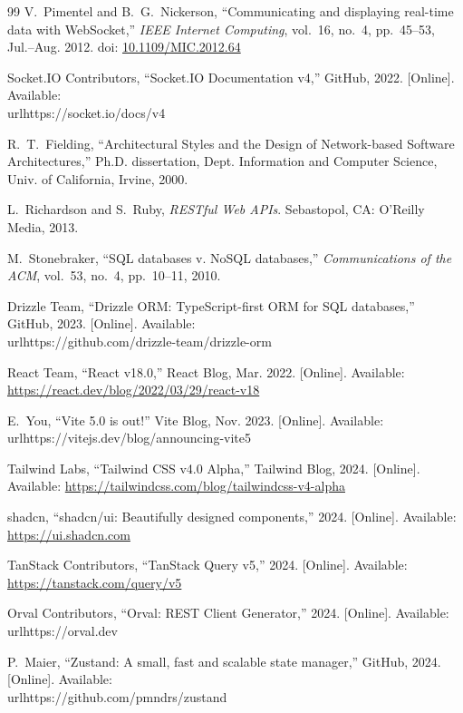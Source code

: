 \documentclass[12pt,a4paper]{article}
\begin{document}
\begin{thebibliography}{99}
V.~Pimentel and B.~G.~Nickerson,
``Communicating and displaying real-time data with WebSocket,''
\textit{IEEE Internet Computing}, vol.~16, no.~4,
pp.~45--53, Jul.--Aug. 2012.
doi: \href{https://doi.org/10.1109/MIC.2012.64}{10.1109/MIC.2012.64}

Socket.IO Contributors, ``Socket.IO Documentation v4,''
GitHub, 2022.
[Online]. Available: \\url{https://socket.io/docs/v4}

R.~T.~Fielding,
``Architectural Styles and the Design of Network-based
Software Architectures,''
Ph.D. dissertation, Dept. Information and Computer Science,
Univ. of California, Irvine, 2000.

L.~Richardson and S.~Ruby,
\textit{RESTful Web APIs}.
Sebastopol, CA: O'Reilly Media, 2013.

M.~Stonebraker, ``SQL databases v. NoSQL databases,''
\textit{Communications of the ACM},
vol.~53, no.~4, pp.~10--11, 2010.

Drizzle Team, ``Drizzle ORM: TypeScript-first ORM for SQL databases,''
GitHub, 2023.
[Online]. Available: \\url{https://github.com/drizzle-team/drizzle-orm}

React Team, ``React v18.0,'' React Blog, Mar. 2022.
[Online]. Available: \url{https://react.dev/blog/2022/03/29/react-v18}

E.~You, ``Vite 5.0 is out!'' Vite Blog, Nov. 2023.
[Online]. Available: \\url{https://vitejs.dev/blog/announcing-vite5}

Tailwind Labs, ``Tailwind CSS v4.0 Alpha,'' Tailwind Blog, 2024.
[Online]. Available: \url{https://tailwindcss.com/blog/tailwindcss-v4-alpha}

shadcn, ``shadcn/ui: Beautifully designed components,'' 2024.
[Online]. Available: \url{https://ui.shadcn.com}

TanStack Contributors, ``TanStack Query v5,'' 2024.
[Online]. Available: \url{https://tanstack.com/query/v5}

Orval Contributors, ``Orval: REST Client Generator,'' 2024.
[Online]. Available: \\url{https://orval.dev}

P.~Maier, ``Zustand: A small, fast and scalable state manager,''
GitHub, 2024.
[Online]. Available: \\url{https://github.com/pmndrs/zustand}


\end{thebibliography}
\end{document}
